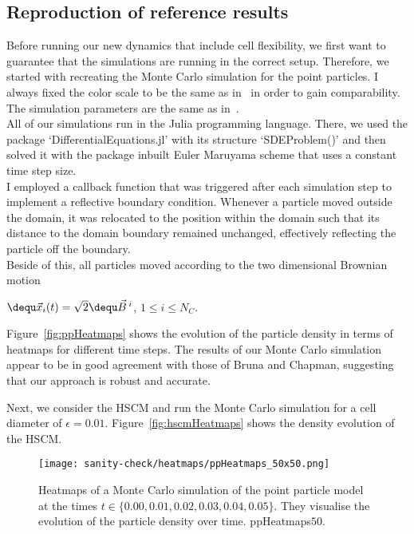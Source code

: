 \subsection{Reproduction of reference results}
Before running our new dynamics that include cell flexibility, we first want to guarantee that the simulations are running in the correct setup.
Therefore, we started with recreating the Monte Carlo simulation for the point particles. 
I always fixed the color scale to be the same as in~\cite{Bruna2012} in order to gain comparability. 
The simulation parameters are the same as in~\cite{Bruna2012}. \\
All of our simulations run in the Julia programming language. 
There, we used the package `DifferentialEquations.jl' with its structure `SDEProblem()' and then solved it with the package inbuilt Euler Maruyama scheme that uses a constant time step size. \\
I employed a callback function that was triggered after each simulation step to implement a reflective boundary condition. 
Whenever a particle moved outside the domain, it was relocated to the position within the domain such that its distance to the domain boundary remained unchanged, effectively reflecting the particle off the boundary. \\
Beside of this, all particles moved according to the two dimensional Brownian motion
\begin{center}
		$ \dequ \vec{x}_i(t) = \sqrt{2} \dequ \vec{B}^{\:i}$, \hspace{0.5em} $1 \leq i \leq N_{C}$.
\end{center}
Figure~\ref{fig:ppHeatmaps} shows the evolution of the particle density in terms of heatmaps for different time steps. 
The results of our Monte Carlo simulation appear to be in good agreement with those of Bruna and Chapman, suggesting that our approach is robust and accurate.

Next, we consider the HSCM and run the Monte Carlo simulation for a cell diameter of $\epsilon = 0.01$. 
Figure~\ref{fig:hscmHeatmaps} shows the density evolution of the HSCM.

\begin{figure}[h]
	\centering
    \texttt{[image: sanity-check/heatmaps/ppHeatmaps\_50x50.png]}
    \caption{Heatmaps of a Monte Carlo simulation of the point particle model at the times $t \in \{0.00, 0.01, 0.02, 0.03, 0.04, 0.05\}$. 
    They visualise the evolution of the particle density over time. 
    ppHeatmaps$50$. 
    }
\end{figure}

